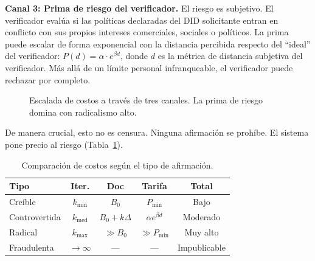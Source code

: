 \documentclass[11pt,a4paper,twocolumn]{article}
\begin{document}
\textbf{Canal 3: Prima de riesgo del verificador.} El riesgo es subjetivo. El verificador evalúa si las políticas declaradas del DID solicitante entran en conflicto con sus propios intereses comerciales, sociales o políticos. La prima puede escalar de forma exponencial con la distancia percibida respecto del ``ideal'' del verificador: $P(d) = \alpha \cdot e^{\beta d}$, donde $d$ es la métrica de distancia subjetiva del verificador. Más allá de un límite personal infranqueable, el verificador puede rechazar por completo.

\begin{figure}[ht]
\centering
{}
\caption{Escalada de costos a través de tres canales. La prima de riesgo domina con radicalismo alto.}
\label{fig:radicalism}
\end{figure}

De manera crucial, esto no es censura. Ninguna afirmación se prohíbe. El sistema pone precio al riesgo (Tabla~\ref{tab:costs}).

\begin{table}[ht]
\centering
\caption{Comparación de costos según el tipo de afirmación.}
\label{tab:costs}
\footnotesize
\begin{tabular}{@{}lcccc@{}}
\toprule
\textbf{Tipo} & \textbf{Iter.} & \textbf{Doc} & \textbf{Tarifa} & \textbf{Total} \\
\midrule
Creíble & $k_{\min}$ & $B_0$ & $P_{\min}$ & Bajo \\
Controvertida & $k_{\text{med}}$ & $B_0{+}k\Delta$ & $\alpha e^{\beta d}$ & Moderado \\
Radical & $k_{\max}$ & $\gg B_0$ & $\gg P_{\min}$ & Muy alto \\
Fraudulenta & $\to\infty$ & --- & --- & Impublicable \\
\bottomrule
\end{tabular}
\end{table}
\end{document}
